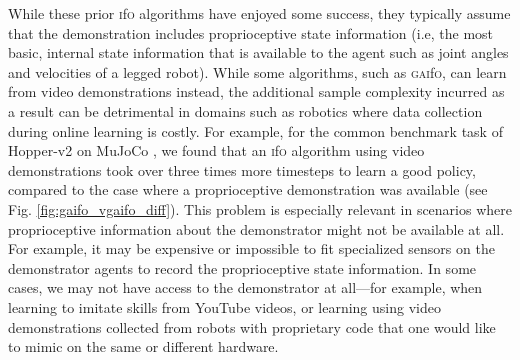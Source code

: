 \documentclass[letterpaper, 10 pt, conference]{ieeeconf}  %
\newcommand{\gaifo}{\textsc{gai}f\textsc{o}}
\newcommand{\ifo}{\textsc{i}f\textsc{o}}
\begin{document}
While these prior \ifo{} algorithms have enjoyed some success, they typically assume that the demonstration includes proprioceptive state information (i.e, the most basic, internal state information that is available to the agent such as joint angles and velocities of a legged robot). While some algorithms, such as \gaifo{}, can learn from video demonstrations instead, the additional sample complexity incurred as a result can be detrimental in domains such as robotics where data collection during online learning is costly. 
For example, for the common benchmark task of Hopper-v2 on MuJoCo \cite{mujoco}, we found that an \ifo{} algorithm using video demonstrations took over three times more timesteps to learn a good policy, compared to the case where a proprioceptive demonstration was available (see Fig. \ref{fig:gaifo_vgaifo_diff}). This problem is especially relevant in scenarios where proprioceptive information about the demonstrator might not be available at all. For example, it may be expensive or impossible to fit specialized sensors on the demonstrator agents to record the proprioceptive state information. In some cases, we may not have access to the demonstrator at all---for example, when learning to imitate skills from YouTube videos, or learning using video demonstrations collected from robots with proprietary code that one would like to mimic on the same or different hardware.

\end{document}
